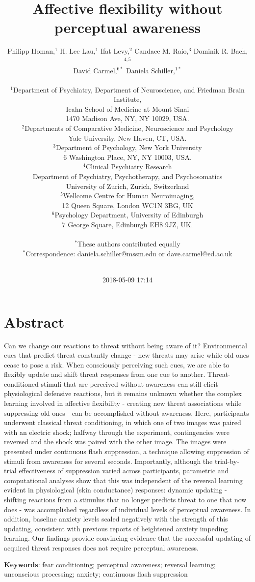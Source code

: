 \documentclass[12pt]{article}
\author{
Philipp Homan,$^{1}$
H. Lee Lau,$^{1}$
Ifat Levy,$^{2}$
Candace M. Raio,$^{3}$
Dominik R. Bach,$^{4, 5}$\\
David Carmel,$^{6\ast}$
Daniela Schiller,$^{1\ast}$\\
\\
\normalsize{$^{1}$Department of Psychiatry,}
\normalsize{Department of Neuroscience, and }
\normalsize{Friedman Brain Institute,}\\
\normalsize{Icahn School of Medicine at Mount Sinai}\\
\normalsize{1470 Madison Ave, NY, NY 10029, USA.}\\
\normalsize{$^{2}$Departments of Comparative Medicine,}
\normalsize{Neuroscience and Psychology}\\
\normalsize{Yale University,}
\normalsize{New Haven, CT, USA.}\\
\normalsize{$^{3}$Department of Psychology, }
\normalsize{New York University}\\
\normalsize{6 Washington Place, NY, NY 10003, USA.}\\
\normalsize{$^{4}$Clinical Psychiatry Research}\\
\normalsize{Department of Psychiatry, Psychotherapy, }
\normalsize{and Psychosomatics}\\
\normalsize{University of Zurich, Zurich, Switzerland}\\
\normalsize{$^{5}$Wellcome Centre for Human Neuroimaging,}\\
\normalsize{12 Queen Square, London WC1N 3BG, UK}\\
\normalsize{$^{6}$Psychology Department, }
\normalsize{University of Edinburgh}\\
\normalsize{7 George Square, Edinburgh EH8 9JZ, UK.}\\
\\
\normalsize{$^{\ast}$These authors contributed equally}\\
\normalsize{$^{\ast}$Correspondence: daniela.schiller@mssm.edu}
\normalsize{or dave.carmel@ed.ac.uk}\\
\\
}
\date{2018-05-09 17:14}
\title{\textbf{Affective flexibility without perceptual awareness}}
\begin{document}
\maketitle
\doublespacing
\clearpage

\section*{Abstract}
\label{sec:org38dfeea}
Can we change our reactions to threat without being aware of it?
Environmental cues that predict threat constantly change - new threats
may arise while old ones cease to pose a risk. When consciously
perceiving such cues, we are able to flexibly update and shift threat
responses from one cue to another. Threat-conditioned stimuli that are
perceived without awareness can still elicit physiological defensive
reactions, but it remains unknown whether the complex learning involved
in affective flexibility - creating new threat associations while
suppressing old ones - can be accomplished without awareness. Here,
participants underwent classical threat conditioning, in which one of
two images was paired with an electric shock; halfway through the
experiment, contingencies were reversed and the shock was paired with
the other image. The images were presented under continuous flash
suppression, a technique allowing suppression of stimuli from awareness
for several seconds. Importantly, although the trial-by-trial
effectiveness of suppression varied across participants, parametric and
computational analyses show that this was independent of the reversal
learning evident in physiological (skin conductance) responses:
dynamic updating - shifting reactions from a stimulus that no
longer predicts threat to one that now does - was accomplished
regardless of individual levels of perceptual awareness. In addition,
baseline anxiety levels scaled negatively with the strength of this
updating, consistent with previous reports of heightened anxiety
impeding learning. Our findings provide convincing evidence that the
successful updating of acquired threat responses does not require
perceptual awareness.

\textbf{Keywords}: fear conditioning; perceptual awareness; reversal learning;
unconscious processing; anxiety; continuous flash suppression

\clearpage
\end{document}
